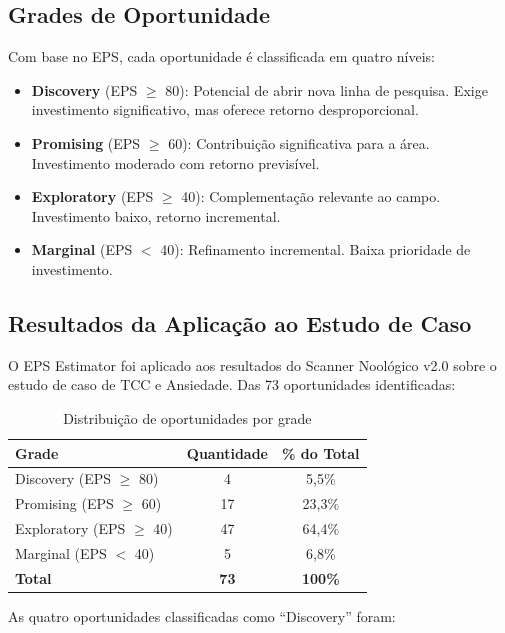 \documentclass[12pt,a4paper]{article}
\begin{document}
\subsection{Grades de Oportunidade}

Com base no EPS, cada oportunidade é classificada em quatro níveis:

\begin{itemize}[itemsep=1pt]
  \item \textbf{Discovery} (EPS $\geq$ 80): Potencial de abrir nova linha de pesquisa. Exige investimento significativo, mas oferece retorno desproporcional.
  \item \textbf{Promising} (EPS $\geq$ 60): Contribuição significativa para a área. Investimento moderado com retorno previsível.
  \item \textbf{Exploratory} (EPS $\geq$ 40): Complementação relevante ao campo. Investimento baixo, retorno incremental.
  \item \textbf{Marginal} (EPS $<$ 40): Refinamento incremental. Baixa prioridade de investimento.
\end{itemize}

\subsection{Resultados da Aplicação ao Estudo de Caso}

O EPS Estimator foi aplicado aos resultados do Scanner Noológico v2.0 sobre o estudo de caso de TCC e Ansiedade. Das 73 oportunidades identificadas:

\begin{table}[H]
  \centering
  \caption{Distribuição de oportunidades por grade}
  \begin{tabular}{l c c}
    \toprule
    \textbf{Grade} & \textbf{Quantidade} & \textbf{\% do Total} \\
    \midrule
    Discovery (EPS $\geq$ 80)  & 4  & 5,5\% \\
    Promising (EPS $\geq$ 60)  & 17 & 23,3\% \\
    Exploratory (EPS $\geq$ 40) & 47 & 64,4\% \\
    Marginal (EPS $<$ 40)      & 5  & 6,8\% \\
    \textbf{Total}             & \textbf{73} & \textbf{100\%} \\
    \bottomrule
  \end{tabular}
\end{table}

As quatro oportunidades classificadas como ``Discovery'' foram:
\end{document}
